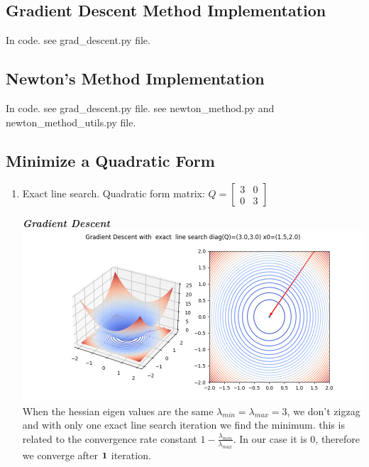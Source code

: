 \documentclass[12pt]{article}
\begin{document}
\subsection{Gradient Descent Method Implementation}
In code. see grad\_descent.py file.
\subsection{Newton’s Method Implementation}
In code. see grad\_descent.py file. see newton\_method.py and newton\_method\_utils.py file.
\newpage
\subsection{Minimize a Quadratic Form}
\begin{enumerate}
\item  Exact line search. Quadratic form matrix:
$Q =  \begin{bmatrix}
    3 & 0\\
    0 & 3
\end{bmatrix} $

\textbf{\textit{Gradient Descent}}\\
\includegraphics[scale=0.5]{grad_descent_exact_4_circle.png}\\
When the hessian eigen values are the same $\lambda_{min} = \lambda_{max} = 3$, we don't zigzag and with only one exact line search iteration we find the minimum. this is related to the convergence rate constant $1 - \frac{\lambda_{min}}{\lambda_{max}}$. In our case it is 0, therefore we converge after $\bold{1}$ iteration.\\


\end{enumerate}
\end{document}
